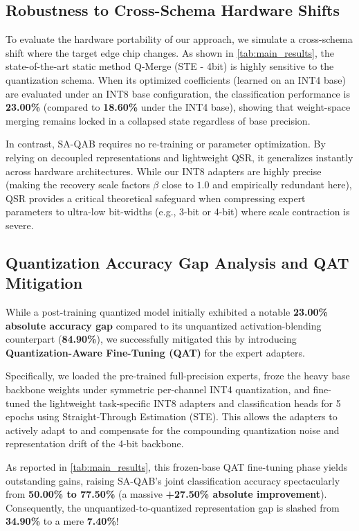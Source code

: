 \subsection{Robustness to Cross-Schema Hardware Shifts}
To evaluate the hardware portability of our approach, we simulate a cross-schema shift where the target edge chip changes. As shown in \cref{tab:main_results}, the state-of-the-art static method Q-Merge (STE - 4bit) is highly sensitive to the quantization schema. When its optimized coefficients (learned on an INT4 base) are evaluated under an INT8 base configuration, the classification performance is \textbf{23.00\%} (compared to \textbf{18.60\%} under the INT4 base), showing that weight-space merging remains locked in a collapsed state regardless of base precision.

In contrast, SA-QAB requires no re-training or parameter optimization. By relying on decoupled representations and lightweight QSR, it generalizes instantly across hardware architectures. While our INT8 adapters are highly precise (making the recovery scale factors $\beta$ close to $1.0$ and empirically redundant here), QSR provides a critical theoretical safeguard when compressing expert parameters to ultra-low bit-widths (e.g., 3-bit or 4-bit) where scale contraction is severe.

\subsection{Quantization Accuracy Gap Analysis and QAT Mitigation}
While a post-training quantized model initially exhibited a notable \textbf{23.00\% absolute accuracy gap} compared to its unquantized activation-blending counterpart (\textbf{84.90\%}), we successfully mitigated this by introducing \textbf{Quantization-Aware Fine-Tuning (QAT)} for the expert adapters. 

Specifically, we loaded the pre-trained full-precision experts, froze the heavy base backbone weights under symmetric per-channel INT4 quantization, and fine-tuned the lightweight task-specific INT8 adapters and classification heads for 5 epochs using Straight-Through Estimation (STE). This allows the adapters to actively adapt to and compensate for the compounding quantization noise and representation drift of the 4-bit backbone.

As reported in \cref{tab:main_results}, this frozen-base QAT fine-tuning phase yields outstanding gains, raising SA-QAB's joint classification accuracy spectacularly from \textbf{50.00\% to 77.50\%} (a massive \textbf{+27.50\% absolute improvement}). Consequently, the unquantized-to-quantized representation gap is slashed from \textbf{34.90\%} to a mere \textbf{7.40\%}!

